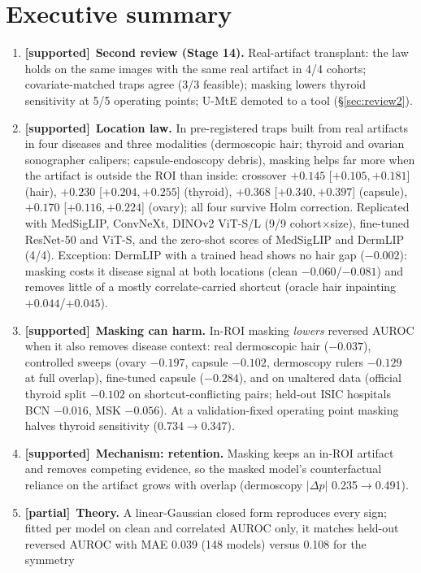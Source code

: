 \documentclass[10pt,a4paper]{article}
\newcommand{\ok}{\textcolor{green!50!black}{\textbf{[supported]}}}
\newcommand{\mixed}{\textcolor{orange!80!black}{\textbf{[partial]}}}
\begin{document}
\section{Executive summary}
\begin{enumerate}[leftmargin=*]
\item \ok\ \textbf{Second review (Stage 14).} Real-artifact transplant: the law holds on the same images with the same
real artifact in 4/4 cohorts; covariate-matched traps agree (3/3 feasible); masking lowers thyroid sensitivity at 5/5
operating points; U-MtE demoted to a tool (\S\ref{sec:review2}).
\item \ok\ \textbf{Location law.} In pre-registered traps built from real artifacts in four diseases and three modalities
(dermoscopic hair; thyroid and ovarian sonographer calipers; capsule-endoscopy debris), masking helps far more when the
artifact is outside the ROI than inside: crossover $+0.145$ [$+0.105,+0.181$] (hair), $+0.230$ [$+0.204,+0.255$]
(thyroid), $+0.368$ [$+0.340,+0.397$] (capsule), $+0.170$ [$+0.116,+0.224$] (ovary); all four survive Holm correction.
Replicated with MedSigLIP, ConvNeXt, DINOv2 ViT-S/L (9/9 cohort$\times$size), fine-tuned ResNet-50 and ViT-S, and the
zero-shot scores of MedSigLIP and DermLIP (4/4). Exception: DermLIP with a trained head shows no hair gap ($-0.002$):
masking costs it disease signal at both locations (clean $-0.060$/$-0.081$) and removes little of a mostly
correlate-carried shortcut (oracle hair inpainting $+0.044$/$+0.045$).
\item \ok\ \textbf{Masking can harm.} In-ROI masking \emph{lowers} reversed AUROC when it also removes disease context:
real dermoscopic hair ($-0.037$), controlled sweeps (ovary $-0.197$, capsule $-0.102$, dermoscopy rulers $-0.129$ at full
overlap), fine-tuned capsule ($-0.284$), and on unaltered data (official thyroid split $-0.102$ on shortcut-conflicting
pairs; held-out ISIC hospitals BCN $-0.016$, MSK $-0.056$). At a validation-fixed operating point masking halves thyroid
sensitivity (0.734$\to$0.347).
\item \ok\ \textbf{Mechanism: retention.} Masking keeps an in-ROI artifact and removes competing evidence, so the masked
model's counterfactual reliance on the artifact grows with overlap (dermoscopy $|\Delta p|$ 0.235$\to$0.491).
\item \mixed\ \textbf{Theory.} A linear-Gaussian closed form reproduces every sign; fitted per model on clean and
correlated AUROC only, it matches held-out reversed AUROC with MAE 0.039 (148 models) versus 0.108 for the symmetry

\end{enumerate}
\end{document}
